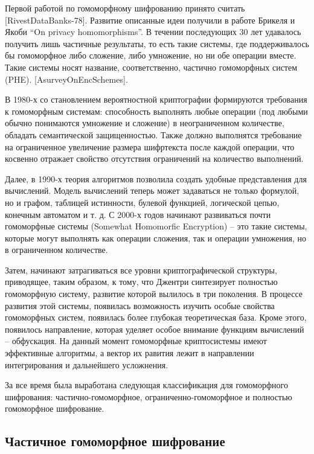 \color{Magenta}  
    Первой работой по гомоморфному шифрованию принято считать [RivestDataBanks-78]. Развитие описанные идеи получили в работе Брикеля и Якоби ``On privacy homomorphisms''. В течении последующих 30 лет удавалось получить лишь частичные результаты, то есть такие системы, где поддерживалось бы гомоморфное либо сложение, либо умножение, но ни обе операции вместе. Такие системы носят название, соответственно, частично гомоморфных систем (PHE). [AsurveyOnEncSchemes].

    В 1980-х со становлением вероятностной криптографии формируются требования к гомоморфным системам: способность выполнять любые операции (под любыми обычно понимаются умножение и сложение) в неограниченном количестве, обладать семантической защищенностью. Также должно выполнятся требование на ограниченное увеличение размера шифртекста после каждой операции, что косвенно отражает свойство отсутствия  ограничений на количество выполнений.

    Далее, в 1990-х теория алгоритмов позволила создать удобные представления для вычислений. Модель вычислений теперь может задаваться не только формулой, но и графом, таблицей истинности, булевой функцией, логической цепью, конечным автоматом и т. д. С 2000-х годов начинают развиваться почти гомоморфные системы  (Somewhat Homomorfic Encryption) -- это такие системы, которые могут выполнять как операции сложения, так и операции умножения, но в ограниченном количестве.

    Затем, начинают затрагиваться все уровни криптографической структуры, приводящее, таким образом, к тому, что Джентри синтезирует полностью гомоморфную систему, развитие которой вылилось в три поколения. В процессе развития этой системы, появилась возможность изучить особые свойства гомоморфных систем, появилась более глубокая теоретическая база. Кроме этого, появилось направление, которая уделяет особое внимание функциям вычислений -- обфускация. На данный момент гомоморфные криптосистемы имеют эффективные алгоритмы, а вектор их равития лежит в направлении интегрирования и дальнейшего усложнения.

    За все время была выработана следующая классификация для гомоморфного шифрования: частично-гомоморфное, ограниченно-гомоморфное и полностью гомоморфное шифрование.

\subsection{Частичное гомоморфное шифрование}

